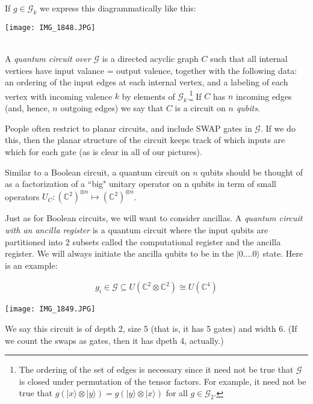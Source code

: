 \documentclass{article}
\begin{document}
If $g \in \mathscr{G}_{k} $ we express this diagrammatically like this:
\begin{center}
 \texttt{[image: IMG\_1848.JPG]}\\\
\end{center}
A \emph{quantum circuit over $\mathscr{G}$} is a directed acyclic graph $ C$ such that all internal vertices have input valance = output valence, together with the following data: an ordering of the input edges at each internal vertex, and a labeling of each vertex with incoming valence $k$ by elements of $\mathscr{G}_{k} $.\footnote{
	The ordering of the set of edges is necessary since it need not be true that $\mathscr{G}$ is closed under permutation of the tensor factors.  For example, it need not be true that 
$g(|x\rangle \otimes |y\rangle)=g(|y\rangle \otimes |x\rangle)$ for all $g \in \mathscr{G}_2$.}
If $C$ has $n$ incoming edges (and, hence, $n$ outgoing edges) we say that $C$ is a circuit on \emph{$n$ qubits}.

People often restrict to planar circuits, and include SWAP gates in $\mathcal{G}$.  If we do this, then the planar structure of the circuit keeps track of which inputs are which for each gate (as is clear in all of our pictures).

Similar to a Boolean circuit, a quantum circuit on $n$ qubits should be thought of as a factorization of a ``big" unitary operator on n qubits in term of small operators  $U_{C} : {({\mathds{C}}^{2})}^{\otimes n} \mapsto {({\mathds{C}}^{2})}^{\otimes n} $.

Just as for Boolean circuits, we will want to consider ancillas.
A \emph{quantum circuit with an ancilla register} is a quantum circuit where the input qubits are partitioned into 2 subsets called the computational register and the ancilla register.  We will always initiate the ancilla qubits to be in the $|0....0\rangle$ state. Here is an example: 

\begin{align*}
g_{i} \in \mathscr{G} \subseteq U({\mathds{C}}^{2} \otimes{\mathds{C}}^{2}) \cong U({\mathds{C}}^{4}) 
\end{align*}

\begin{center}
\texttt{[image: IMG\_1849.JPG]}
\end{center}

We say this circuit is of depth 2, size 5 (that is, it has 5 gates) and width 6.  (If we count the swaps as gates, then it has dpeth 4, actually.)
\end{document}
